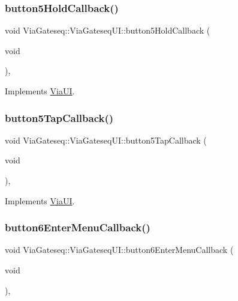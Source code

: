 \subsubsection{\texorpdfstring{button5\+Hold\+Callback()}{button5HoldCallback()}}
{\footnotesize\ttfamily void Via\+Gateseq\+::\+Via\+Gateseq\+U\+I\+::button5\+Hold\+Callback (\begin{DoxyParamCaption}\item[{void}]{ }\end{DoxyParamCaption})\hspace{0.3cm}{\ttfamily [override]}, {\ttfamily [virtual]}}



Implements \mbox{\hyperlink{class_via_u_i_aee783713c816e3807514ee9b06b571b0}{Via\+UI}}.

\mbox{\label{class_via_gateseq_1_1_via_gateseq_u_i_a0622c45ab381c9bde60480781f90981c}} 
\subsubsection{\texorpdfstring{button5\+Tap\+Callback()}{button5TapCallback()}}
{\footnotesize\ttfamily void Via\+Gateseq\+::\+Via\+Gateseq\+U\+I\+::button5\+Tap\+Callback (\begin{DoxyParamCaption}\item[{void}]{ }\end{DoxyParamCaption})\hspace{0.3cm}{\ttfamily [override]}, {\ttfamily [virtual]}}



Implements \mbox{\hyperlink{class_via_u_i_a5066c22385f31c24ec939d680a66a628}{Via\+UI}}.

\mbox{\label{class_via_gateseq_1_1_via_gateseq_u_i_adf289572ed287fdc4c9ff4029f008b7b}} 
\subsubsection{\texorpdfstring{button6\+Enter\+Menu\+Callback()}{button6EnterMenuCallback()}}
{\footnotesize\ttfamily void Via\+Gateseq\+::\+Via\+Gateseq\+U\+I\+::button6\+Enter\+Menu\+Callback (\begin{DoxyParamCaption}\item[{void}]{ }\end{DoxyParamCaption})\hspace{0.3cm}{\ttfamily [override]}, {\ttfamily [virtual]}}



